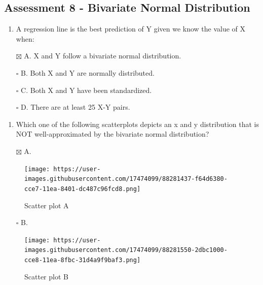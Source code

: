 \documentclass[
]{article}
\providecommand{\tightlist}{%
  \setlength{\itemsep}{0pt}\setlength{\parskip}{0pt}}
\begin{document}
\hypertarget{assessment-8---bivariate-normal-distribution}{%
\subsection{Assessment 8 - Bivariate Normal
Distribution}\label{assessment-8---bivariate-normal-distribution}}

\begin{enumerate}
\def\labelenumi{\arabic{enumi}.}
\tightlist
\item
  A regression line is the best prediction of Y given we know the value
  of X when:
\end{enumerate}

\begin{itemize}
\tightlist
\item[$\boxtimes$]
  A. X and Y follow a bivariate normal distribution.
\item[$\square$]
  B. Both X and Y are normally distributed.
\item[$\square$]
  C. Both X and Y have been standardized.
\item[$\square$]
  D. There are at least 25 X-Y pairs.
\end{itemize}

\begin{enumerate}
\def\labelenumi{\arabic{enumi}.}
\setcounter{enumi}{1}
\tightlist
\item
  Which one of the following scatterplots depicts an x and y
  distribution that is NOT well-approximated by the bivariate normal
  distribution?
\end{enumerate}

\begin{itemize}
\tightlist
\item[$\boxtimes$]
  A.
\end{itemize}

\begin{figure}
\centering
\texttt{[image: https://user-images.githubusercontent.com/17474099/88281437-f64d6380-cce7-11ea-8401-dc487c96fcd8.png]}
\caption{Scatter plot A}
\end{figure}

\begin{itemize}
\tightlist
\item[$\square$]
  B.
\end{itemize}

\begin{figure}
\centering
\texttt{[image: https://user-images.githubusercontent.com/17474099/88281550-2dbc1000-cce8-11ea-8fbc-31d4a9f9baf3.png]}
\caption{Scatter plot B}
\end{figure}
\end{document}
